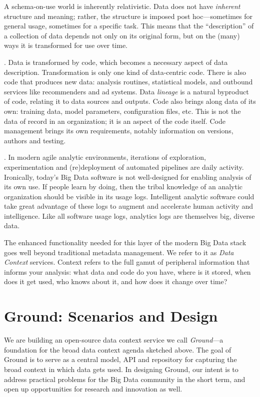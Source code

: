 \documentclass{sig-alternate}
\begin{document}
 A schema-on-use world is inherently relativistic. Data does not have \emph{inherent} structure and meaning; rather, the structure is imposed post hoc---sometimes for general usage, sometimes for a specific task.  This means that the ``description'' of a collection of data depends not only on its original form, but on the (many) ways it is transformed for use over time.  

. Data is transformed by code, which becomes a necessary aspect of data description. Transformation is only one kind of data-centric code. There is also code that produces new data: analysis routines, statistical models, and outbound services like recommenders and ad systems. Data \emph{lineage} is a natural byproduct of code, relating it to data sources and outputs. Code also brings along data of its own: training data, model parameters, configuration files, etc. This is not the data of record in an organization; it is an aspect of the code itself. Code management brings its own requirements, notably information on versions, authors and testing.  

. In modern agile analytic environments, iterations of exploration, experimentation and (re)deployment of automated pipelines are daily activity. Ironically, today's Big Data software is not well-designed for enabling analysis of its own use. If people learn by doing, then the tribal knowledge of an analytic organization should be visible in its usage logs. Intelligent analytic software could take great advantage of these logs to augment and accelerate human activity and intelligence. Like all software usage logs, analytics logs are themselves big, diverse data.

\smallitembot
The enhanced functionality needed for this layer of the modern Big Data stack goes well beyond traditional metadata management. We refer to it as \emph{Data Context} services. Context refers to the full gamut of peripheral information that informs your analysis: what data and code do you have, where is it stored, when does it get used, who knows about it, and how does it change over time?  

\section{Ground: Scenarios and Design}
We are building an open-source data context service we call \emph{Ground}---a foundation for the broad data context agenda sketched above. 
The goal of Ground is to serve as a central model, API and repository for capturing the broad context in which data gets used. In designing Ground, our intent is to address practical problems for the Big Data community in the short term, and open up opportunities for research and innovation as well.
\end{document}
